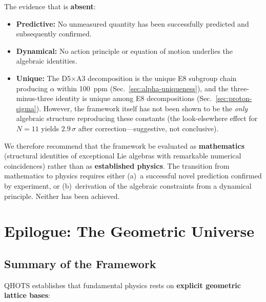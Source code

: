\documentclass[aps,prd,twocolumn,superscriptaddress,floatfix,nofootinbib]{revtex4-2}
\theoremstyle{definition}
\theoremstyle{remark}
\begin{document}
\noindent
The evidence that is \textbf{absent}:

\begin{itemize}
\item \textbf{Predictive:} No unmeasured quantity has been successfully
      predicted and subsequently confirmed.

\item \textbf{Dynamical:} No action principle or equation of motion
      underlies the algebraic identities.

\item \textbf{Unique:} The D5$\times$A3 decomposition is the unique
      E8 subgroup chain producing $\alpha$ within 100~ppm
      (Sec.~\ref{sec:alpha-uniqueness}), and the three-minus-three
      identity is unique among E8 decompositions
      (Sec.~\ref{sec:proton-sigma}).  However, the framework itself
      has not been shown to be the \emph{only} algebraic structure
      reproducing these constants (the look-elsewhere effect for
      $N{=}11$ yields $2.9\,\sigma$ after correction---suggestive,
      not conclusive).
\end{itemize}

\noindent
We therefore recommend that the framework be evaluated as
\textbf{mathematics} (structural identities of exceptional Lie
algebras with remarkable numerical coincidences) rather than as
\textbf{established physics}.  The transition from mathematics to
physics requires either (a)~a successful novel prediction confirmed
by experiment, or (b)~derivation of the algebraic constraints from a
dynamical principle.  Neither has been achieved.

\section{Epilogue: The Geometric Universe}

\subsection{Summary of the Framework}

QHOTS establishes that fundamental physics rests on \textbf{explicit geometric lattice bases}:
\end{document}
